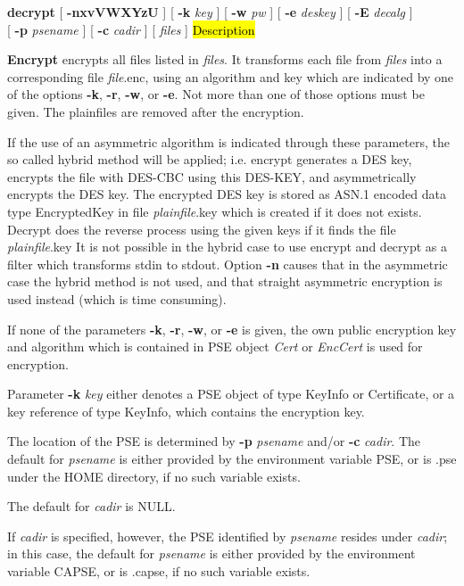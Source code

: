 {\bf decrypt} [ {\bf -nxvVWXYzU} ] [ {\bf -k} {\em key} ] [ {\bf -w} {\em pw} ] [ {\bf -e} {\em deskey} ] [ {\bf -E} {\em decalg} ] \\
\hspace*{1.59cm} [ {\bf -p} {\em psename} ] [ {\bf -c} {\em cadir} ] [ {\em files} ]
\hl{Description}

{\large\bf Encrypt} encrypts all files listed in {\em files}. It transforms each
file from {\em files} into a corresponding file {\em file}.enc, using 
an algorithm and key which are indicated by one of the options 
{\bf -k}, {\bf -r}, {\bf -w}, or {\bf -e}. Not more than one of those options 
must be given.
The plainfiles are removed after the encryption.

If the use of an asymmetric algorithm is indicated through
these parameters, the so called hybrid method will be applied; i.e. encrypt
generates a DES key, encrypts the file with DES-CBC using this DES-KEY,
and asymmetrically encrypts the DES key. The encrypted DES key is stored as
ASN.1 encoded data type EncryptedKey
in file {\em plainfile}.key which is created if it does not exists. Decrypt
does the reverse process using the given keys if it finds the file {\em plainfile}.key
It is not possible in the hybrid case to use encrypt and decrypt as a filter
which transforms stdin to stdout. Option {\bf -n} causes that in the asymmetric case
the hybrid method is not used, and that straight asymmetric encryption is
used instead (which is time consuming).
 
If none of the parameters {\bf -k}, {\bf -r}, {\bf -w}, or {\bf -e} is given, the own public
encryption key and algorithm which is contained in PSE object {\em Cert} or {\em EncCert} is used
for encryption. 
 
Parameter {\bf -k} {\em key} either denotes a PSE object of type KeyInfo or Certificate, 
or a key reference of type KeyInfo, which contains the encryption key.

The location of the PSE is determined by {\bf -p} {\em psename} and/or {\bf -c} {\em cadir}. 
The default for {\em 
psename} is either provided by the environment variable PSE, or is .pse under the HOME directory, 
if no such variable exists.
 
The default for {\em cadir} is NULL. 

If {\em cadir} is specified,
however, the PSE identified by {\em psename} resides under {\em cadir}; in this case, the default
for {\em psename} is either provided by the environment variable CAPSE, or is .capse, if no such variable
exists. 
 
